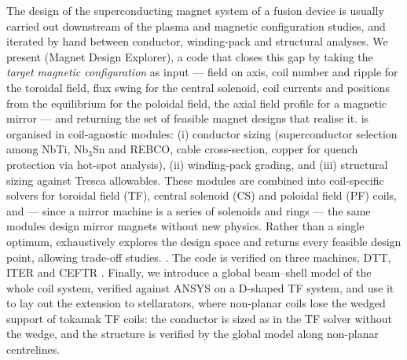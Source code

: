 The design of the superconducting magnet system of a fusion device is usually
carried out downstream of the plasma and magnetic configuration studies, and
iterated by hand between conductor, winding-pack and structural analyses. We
present \MADE{} (Magnet Design Explorer), a code that closes this gap by taking
the \emph{target magnetic configuration} as input --- field on axis, coil
number and ripple for the toroidal field, flux swing for the central solenoid,
coil currents and positions from the equilibrium for the poloidal field, the
axial field profile for a magnetic mirror --- and returning the set of
feasible magnet designs that realise it. \MADE{} is organised in coil-agnostic
modules: (i) conductor sizing (superconductor selection among NbTi, Nb$_3$Sn
and REBCO, cable cross-section, copper for quench protection via hot-spot
analysis), (ii) winding-pack grading, and (iii) structural sizing against
Tresca allowables. These modules are combined into coil-specific solvers for
toroidal field (TF), central solenoid (CS) and poloidal field (PF) coils, and
--- since a mirror machine is a series of solenoids and rings --- the same
modules design mirror magnets without new physics. Rather than a single
optimum, \MADE{} exhaustively explores the design space and returns every
feasible design point, allowing trade-off studies. . The code is verified on three machines, DTT, ITER and CEFTR
. Finally, we introduce a global beam--shell model of the
whole coil system, verified against ANSYS on a D-shaped TF system, and use
it to lay out the extension to stellarators, where non-planar coils lose
the wedged support of tokamak TF coils: the conductor is sized as in the TF
solver without the wedge, and the structure is verified by the global
model along non-planar centrelines.
